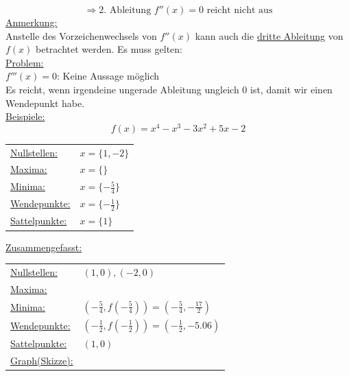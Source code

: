 \documentclass[11pt]{amsart}
\theoremstyle{remark}
\begin{document}
	\begin{equation*}
		\Rightarrow 
		\text {2. Ableitung } f''(x)=0 \text{ reicht nicht aus}
	\end{equation*}
\underline{Anmerkung:}\\
	Anstelle des Vorzeichenwechsels von $f''(x)$ kann auch die \underline{dritte Ableitung} von $f(x)$ betrachtet werden. Es muss gelten:
	\\
\underline{Problem:}\\
	$f'''(x)=0$: Keine Aussage m\"oglich\\
	Es reicht, wenn irgendeine ungerade Ableitung ungleich 0 ist, damit wir einen Wendepunkt habe.\\
\underline{Beispiele:}\\
	\begin{equation}
		f(x)=x^4-x^3-3x^2+5x-2
	\end{equation}
	\begin{table}[h]
		\begin{center}
			\begin{tabular}[h]{ll}
				\underline{Nullstellen:} &$x=\lbrace 1, -2\rbrace$\\
				\underline{Maxima:} & $x=\lbrace \rbrace$\\
				\underline {Minima:} & $x=\lbrace-\frac 54 \rbrace$\\
				\underline{Wendepunkte:} & $x=\lbrace-\frac 12 \rbrace$\\
				\underline{Sattelpunkte:} & $x=\lbrace 1 \rbrace$\\
			\end{tabular}
		\end{center}
		\label{default}
	\end{table}
	\newpage
	\underline{Zusammengefasst:}\\
	\begin{table}[h]
		\begin{center}
			\begin{tabular}[h]{ll}
				\underline{Nullstellen:} & $(1,0), (-2,0)$\\
				\underline{Maxima:} & \\
				\underline {Minima:} & $\left(-\frac 54,f(-\frac 54)\right)=(-\frac 54, -\frac {17}{2})$\\
				\underline{Wendepunkte:} & $\left(-\frac 12, f(-\frac 12)\right)=(-\frac 12, -5.06)$\\
				\underline{Sattelpunkte:} & $(1,0)$\\
				\underline{Graph(Skizze):} & \\
			\end{tabular}
		\end{center}
		\label{default}
	\end{table}
\end{document}
